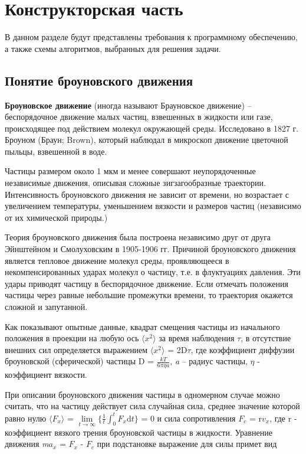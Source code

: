 \chapter{Конструкторская часть}

В данном разделе будут представлены требования к программному обеспечению, а также схемы алгоритмов, выбранных для решения задачи.

\section{Понятие броуновского движения}

\textbf{Броуновское движение} (иногда называют Брауновское движение) -- беспорядочное движение малых частиц, взвешенных в жидкости или газе, происходящее под действием молекул окружающей среды. Исследовано в 1827 г. Броуном (Браун; Brown), который наблюдал в микроскоп движение цветочной пыльцы, взвешенной в воде. 


Частицы размером около 1 мкм и менее совершают неупорядоченные независимые движения, описывая сложные зигзагообразные траектории. Интенсивность броуновского движения не зависит от времени, но возрастает с увеличением температуры, уменьшением вязкости и размеров частиц (независимо от их химической природы.)

Теория броуновского движения была построена независимо друг от друга Эйнштейном и Смолуховским в 1905-1906 гг. Причиной броуновского движения является тепловое движение молекул среды, проявляющееся в некомпенсированных ударах молекул о частицу, т.е. в флуктуациях давления. Эти удары приводят частицу в беспорядочное движение. Если отмечать положения частицы через равные небольшие промежутки времени, то траектория окажется сложной и запутанной.

Как показывают опытные данные, квадрат смещения частицы из начального положения в проекции на любую ось $ \langle x^2 \rangle $ за время наблюдения $\tau$, в отсутствие внешних сил определяется выражением $  \langle x^2 \rangle $ = 2D$\tau$, где коэффициент диффузии броуновской (сферической) частицы D = $\frac{\textit{k}T}{6\pi\eta\textit{a}}$, \textit{a} – радиус частицы, $\eta$ - коэффициент вязкости.

При описании броуновского движения частицы в одномерном случае можно считать, что на частицу действует сила случайная сила, среднее значение которой равно нулю $  \langle F_x \rangle $ = $\lim\limits_{t \to \infty} \{\frac{1}{t}\int_{0}^{t}F_x\mathrm{d}t\}$ = 0 и сила сопротивления $F_c$ = r$v_x$, где r - коэффициент вязкого трения броуновской частицы в жидкости.  Уравнение движения  \textit{m$a_x$} = $F_x$ - $F_c$ при подстановке выражение для силы примет вид

